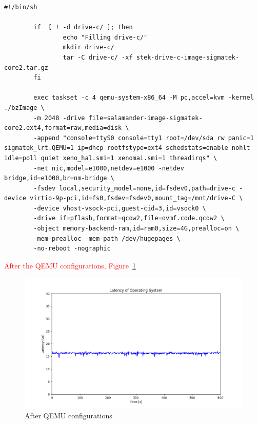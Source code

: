 \documentclass[MMR,Master,english]{twbook}
\begin{document}
\vspace{1em}
\begin{minipage}{\linewidth}
	\begin{lstlisting}[name={Tuned QEMU script for starting Salamander 4 virtualization},label={script:qemu_def_tuned}]
		#!/bin/sh

		if  [ ! -d drive-c/ ]; then
				echo "Filling drive-c/"
				mkdir drive-c/
				tar -C drive-c/ -xf stek-drive-c-image-sigmatek-core2.tar.gz
		fi
			
		exec taskset -c 4 qemu-system-x86_64 -M pc,accel=kvm -kernel ./bzImage \
		-m 2048 -drive file=salamander-image-sigmatek-core2.ext4,format=raw,media=disk \
		-append "console=ttyS0 console=tty1 root=/dev/sda rw panic=1 sigmatek_lrt.QEMU=1 ip=dhcp rootfstype=ext4 schedstats=enable nohlt idle=poll quiet xeno_hal.smi=1 xenomai.smi=1 threadirqs" \
		-net nic,model=e1000,netdev=e1000 -netdev bridge,id=e1000,br=nm-bridge \
		-fsdev local,security_model=none,id=fsdev0,path=drive-c -device virtio-9p-pci,id=fs0,fsdev=fsdev0,mount_tag=/mnt/drive-C \
		-device vhost-vsock-pci,guest-cid=3,id=vsock0 \
		-drive if=pflash,format=qcow2,file=ovmf.code.qcow2 \
		-object memory-backend-ram,id=ram0,size=4G,prealloc=on \
		-mem-prealloc -mem-path /dev/hugepages \
		-no-reboot -nographic
	\end{lstlisting}
\end{minipage}


\textcolor{red}{After the QEMU configurations, Figure~\ref{fig:max_latency_rt_kernelparam_host_qemu}}

\begin{figure}[H]
	\centering
	\includegraphics[width=1.0\columnwidth]{masterthesis-documentation/docs/sigmatek/xenomai/6rt_kernelparam_host_qemu/max_latency_rt_kernelparam_host_qemu/max_latency_rt_kernelparam_host_qemu.png}
	\caption[After QEMU configurations]{After QEMU configurations}
	\label{fig:max_latency_rt_kernelparam_host_qemu}
\end{figure}
\end{document}
